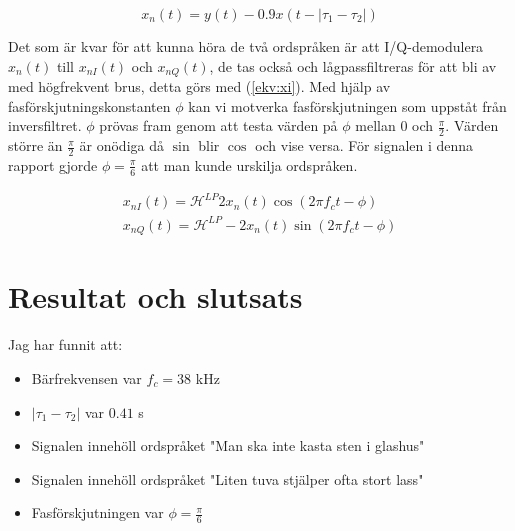 \documentclass[10pt,twocolumn]{article}
\begin{document}
\begin{equation}
x_n(t)=y(t) - 0.9x(t-|\tau_1-\tau_2|)
\label{ekv:invfilt}
\end{equation} 


Det som är kvar för att kunna höra de två ordspråken är att I/Q-demodulera $x_n(t)$ till $x_{nI}(t)$ och $x_{nQ}(t)$, de tas också och lågpassfiltreras för att bli av med högfrekvent brus, detta görs med (\ref{ekv:xi}).  
Med hjälp av fasförskjutningskonstanten $\phi$ kan vi motverka fasförskjutningen som uppståt från inversfiltret. $\phi$ prövas fram genom att testa värden på $\phi$ mellan $0$ och $\frac{\pi}{2}$. Värden större än $\frac{\pi}{2}$ är onödiga då $\sin$ blir $\cos$ och vise versa. För signalen i denna rapport gjorde $\phi = \frac{\pi}{6}$ att man kunde urskilja ordspråken. 

\begin{equation}
\begin{split}
x_{nI}(t)= \mathcal{H}^{LP} 2x_n(t)\cos(2\pi f_c t - \phi)\\
x_{nQ}(t)= \mathcal{H}^{LP} -2x_n(t)\sin(2\pi f_c t - \phi)
\end{split}
\label{ekv:xi}
\end{equation} 

\section{Resultat och slutsats}

Jag har funnit att:
\begin{itemize}
\item Bärfrekvensen var $f_c=38$ kHz
\item $|\tau_1 - \tau_2|$ var $0.41$ s
\item Signalen innehöll ordspråket "Man ska inte kasta sten i glashus" 
\item Signalen innehöll ordspråket "Liten tuva stjälper ofta stort lass"
\item Fasförskjutningen var $\phi= \frac{\pi}{6}$
\end{itemize}
\clearpage
\end{document}
